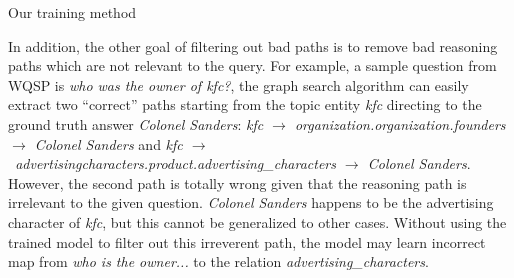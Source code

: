 \begin{algorithm}

 
 \ForEach {batch}{
  \ForEach{$(q^{n},y^{n}, e_0^{n})$ in the batch}{
  Get top $k_2$ paths in $\mathcal{P}$ sorted by $p(\mathbf{p}|q)$ based on current model:
		 	$\tilde{\mathcal{P}}^n = \{{\mathbf{p}}^n_{1},\cdots,{\mathbf{p}}^n_{k_2} \}$\\
  } 
    Update model parameters by maximizing $\sum\limits_{(q^{n},y^{n}, e_0^{n}) \in \text{batch}} \log \sum\limits_{\mathbf{p} \in \tilde{\mathcal{P}}^n} p(y^{n}|\mathbf{p},q^{n}) P(\mathbf{p}|q^{n}) $
  }

 \caption{Our training method}
 \label{alg:train}
\end{algorithm}

In addition, the other goal of filtering out bad paths is to remove bad reasoning paths which are not relevant to the query. For example, a sample question from WQSP is \textit{who was the owner of kfc?}, the graph search algorithm can easily extract two ``correct'' paths starting from the topic entity \textit{kfc} directing to the ground truth answer \textit{Colonel Sanders}: \textit{kfc $\rightarrow$ organization.organization.founders $\rightarrow$ Colonel Sanders} and \textit{kfc $\rightarrow$\ advertisingcharacters.product.advertising\_characters $\rightarrow$ Colonel Sanders}. However, the second path is totally wrong given that the reasoning path is irrelevant to the given question. \textit{Colonel Sanders} happens to be the advertising character of \textit{kfc}, but this cannot be generalized to other cases. Without using the trained model to filter out this irreverent path, the model may learn incorrect map from \textit{who is the owner...} to the relation \textit{advertising\_characters}.


